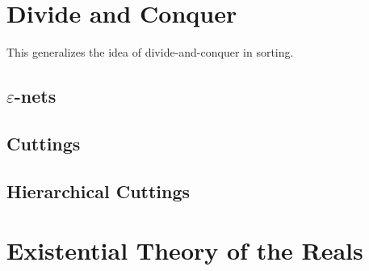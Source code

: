\chapter{Divide and Conquer}

This generalizes the idea of divide-and-conquer in sorting.

\section{\(\varepsilon\)-nets}


\section{Cuttings}


\section{Hierarchical Cuttings}


\chapter{Existential Theory of the Reals}

